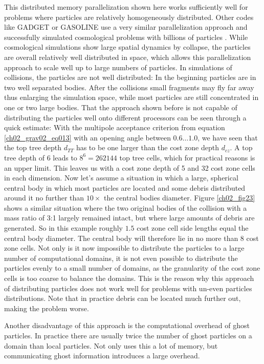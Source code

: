 This distributed memory parallelization shown here works sufficiently well for problems where particles are  relatively homogeneously distributed. Other codes like GADGET or GASOLINE use a very similar parallelization approach and successfully simulated cosmological problems with billions of particles \cite{2005Natur.435..629S}. While cosmological simulations show large spatial dynamics by collapse, the particles are overall relatively well distributed in space, which allows this parallelization approach to scale well up to large numbers of particles. In simulations of collisions, the particles are not well distributed: In the beginning particles are in two well separated bodies. After the collisions small fragments may fly far away thus enlarging the simulation space, while most particles are still concentrated in one or two large bodies. That the approach shown before is not capable of distributing the particles well onto different processors can be seen through a quick estimate: With the multipole acceptance criterion from equation \ref{ch02_grav02_eq013} with an opening angle between $0.6 \dots 1.0 $, we have seen that the top tree depth $d_{TT}$ has to be one larger than the cost zone depth $d_{cz}$. A top tree depth of 6 leads to $8^6 = 262144$ top tree cells, which for practical reasons is an upper limit.  This leaves us with a cost zone depth of 5 and 32 cost zone cells in each dimension. Now let's assume a situation in which a large, spherical central body in which most particles are located and some debris distributed around it no further than $10 \times$ the central bodies diameter. Figure \ref{ch02_fig23} shows a similar situation where the two original bodies of the collision with a mass ratio of 3:1 largely remained intact, but where large amounts of debris are generated. So in this example roughly $1.5$ cost zone cell side lengths equal the central body diameter. The central body will therefore lie in no more than 8 cost zone cells. Not only is it now impossible to distribute the particles to a large number of computational domains, it is not even possible to distribute the particles evenly to a small number of domains, as the granularity of the cost zone cells is too coarse to balance the domains. This is the reason why this approach of distributing particles does not work well for problems with un-even particles distributions. Note that in practice debris can be located much further out, making the problem worse.

Another disadvantage of this approach is the computational overhead of ghost particles. In practice there are usually twice the number of ghost particles on a domain than local particles. Not only uses this a lot of memory, but communicating ghost information introduces a large overhead. 

